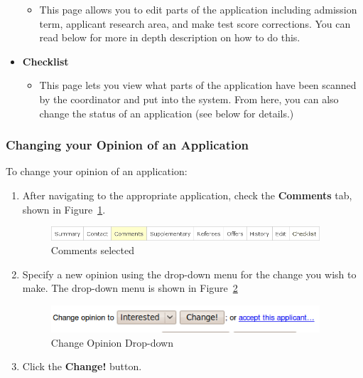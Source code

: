 \documentclass[titlepage]{article}
\begin{document}
\begin{itemize}
  \begin{itemize}
    \item This page allows you to edit parts of the application including
    admission term, applicant research area, and make test score corrections.
    You can read below for more in depth description on how to do this.
  \end{itemize}
\item \textbf{\textsf{Checklist}}
  \begin{itemize}
    \item This page lets you view what parts of the application have been
    scanned by the coordinator and put into the system.  From here, you can
    also change the status of an application (see below for details.)
  \end{itemize}
\end{itemize}


\subsubsection{Changing your Opinion of an Application}

To change your opinion of an application:
\begin{enumerate}
\item After navigating to the appropriate application, check the \textbf{\textsf{Comments}} tab, shown in Figure~\ref{nComments}.
  \begin{figure}[h!]
    \begin{center}
      \includegraphics[width=10cm]{apptabs_comments.png}
    \end{center}
    \caption{Comments selected}
    \label{nComments}
  \end{figure}
\item Specify a new opinion using the drop-down menu for the change you wish to make.  The drop-down menu is shown in Figure~\ref{nChangeOpinion}
  \begin{figure}[h!]
    \begin{center}
      \includegraphics[width=10cm]{nAccept.png}
    \end{center}
    \caption{Change Opinion Drop-down}
    \label{nChangeOpinion}
  \end{figure}
\item Click the \textbf{\textsf{Change!}} button.
\end{enumerate}
\end{document}
